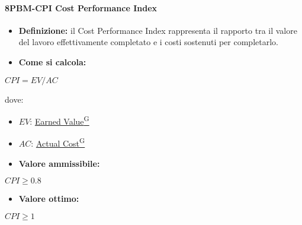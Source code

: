 \paragraph*{8PBM-CPI Cost Performance Index}
\begin{itemize}
    \item \textbf{Definizione:} il Cost Performance Index rappresenta il rapporto tra il valore del lavoro effettivamente completato e i costi sostenuti per completarlo.
    \item \textbf{Come si calcola:}
\end{itemize}
\begin{center}
   $CPI = EV/AC$ 
\end{center}
dove:
\begin{itemize}[label=$\rightarrow$]
    \item $EV$: \href{https://code7crusaders.github.io/docs/RTB/documentazione_interna/glossario.html#earned-value}{Earned Value\textsuperscript{G}}
    \item $AC$: \href{https://code7crusaders.github.io/docs/RTB/documentazione_interna/glossario.html#actual-cost}{Actual Cost\textsuperscript{G}}
\end{itemize}
\begin{itemize}
    \item \textbf{Valore ammissibile:}
\end{itemize}
\begin{center}
    $CPI \geq 0.8$
\end{center}
\begin{itemize}
    \item \textbf{Valore ottimo:}
\end{itemize}
\begin{center}
    $CPI \geq 1$
\end{center}

